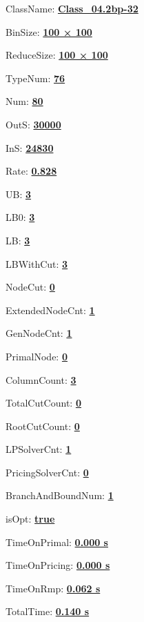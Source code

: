 \documentclass[11pt]{article}
\begin{document}
\pagestyle{empty}


ClassName: \underline{\textbf{Class_04.2bp-32}}
\par
BinSize: \underline{\textbf{100 × 100}}
\par
ReduceSize: \underline{\textbf{100 × 100}}
\par
TypeNum: \underline{\textbf{76}}
\par
Num: \underline{\textbf{80}}
\par
OutS: \underline{\textbf{30000}}
\par
InS: \underline{\textbf{24830}}
\par
Rate: \underline{\textbf{0.828}}
\par
UB: \underline{\textbf{3}}
\par
LB0: \underline{\textbf{3}}
\par
LB: \underline{\textbf{3}}
\par
LBWithCut: \underline{\textbf{3}}
\par
NodeCut: \underline{\textbf{0}}
\par
ExtendedNodeCnt: \underline{\textbf{1}}
\par
GenNodeCnt: \underline{\textbf{1}}
\par
PrimalNode: \underline{\textbf{0}}
\par
ColumnCount: \underline{\textbf{3}}
\par
TotalCutCount: \underline{\textbf{0}}
\par
RootCutCount: \underline{\textbf{0}}
\par
LPSolverCnt: \underline{\textbf{1}}
\par
PricingSolverCnt: \underline{\textbf{0}}
\par
BranchAndBoundNum: \underline{\textbf{1}}
\par
isOpt: \underline{\textbf{true}}
\par
TimeOnPrimal: \underline{\textbf{0.000 s}}
\par
TimeOnPricing: \underline{\textbf{0.000 s}}
\par
TimeOnRmp: \underline{\textbf{0.062 s}}
\par
TotalTime: \underline{\textbf{0.140 s}}
\par
\newpage
\end{document}
